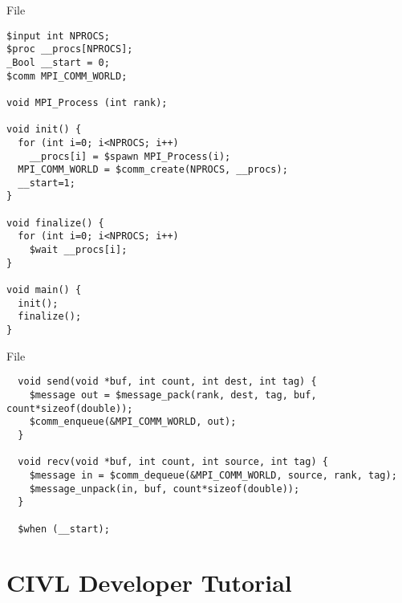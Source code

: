 \documentclass[t]{beamer}
\begin{document}
\begin{frame}[containsverbatim]{File }
  \scriptsize
\begin{verbatim}
$input int NPROCS;
$proc __procs[NPROCS];
_Bool __start = 0;
$comm MPI_COMM_WORLD;

void MPI_Process (int rank);

void init() {
  for (int i=0; i<NPROCS; i++)
    __procs[i] = $spawn MPI_Process(i);
  MPI_COMM_WORLD = $comm_create(NPROCS, __procs);
  __start=1;
}

void finalize() {
  for (int i=0; i<NPROCS; i++)
    $wait __procs[i];
}

void main() {
  init();
  finalize();
}
\end{verbatim}
\end{frame}

\begin{frame}[containsverbatim]{File }
  \scriptsize
\begin{verbatim}
  void send(void *buf, int count, int dest, int tag) {
    $message out = $message_pack(rank, dest, tag, buf, count*sizeof(double));
    $comm_enqueue(&MPI_COMM_WORLD, out);
  }

  void recv(void *buf, int count, int source, int tag) {
    $message in = $comm_dequeue(&MPI_COMM_WORLD, source, rank, tag);
    $message_unpack(in, buf, count*sizeof(double));
  }

  $when (__start);
\end{verbatim}
\end{frame}

\section{CIVL Developer Tutorial}
\end{document}
